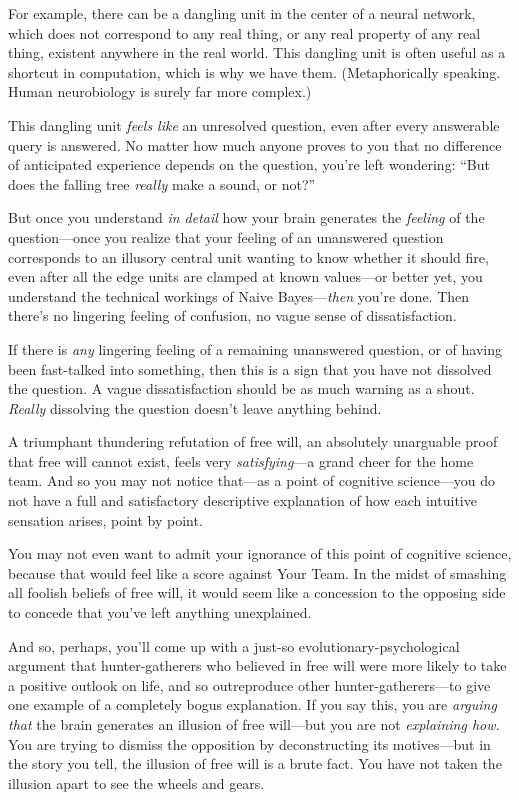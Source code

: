 {
 For example, there can be a dangling unit in the center of a
neural network, which does not correspond to any real thing, or any
real property of any real thing, existent anywhere in the real world.
This dangling unit is often useful as a shortcut in computation, which
is why we have them. (Metaphorically speaking. Human neurobiology is
surely far more complex.)}

{
 This dangling unit \textit{feels like} an unresolved question,
even after every answerable query is answered. No matter how much
anyone proves to you that no difference of anticipated experience
depends on the question, you're left wondering:
``But does the falling tree \textit{really} make a
sound, or not?''}

{
 But once you understand \textit{in detail} how your brain
generates the \textit{feeling} of the question---once you realize that
your feeling of an unanswered question corresponds to an illusory
central unit wanting to know whether it should fire, even after all the
edge units are clamped at known values---or better yet, you understand
the technical workings of Naive Bayes---\textit{then}
you're done. Then there's no lingering
feeling of confusion, no vague sense of dissatisfaction.}

{
 If there is \textit{any} lingering feeling of a remaining
unanswered question, or of having been fast-talked into something, then
this is a sign that you have not dissolved the question. A vague
dissatisfaction should be as much warning as a shout. \textit{Really}
dissolving the question doesn't leave anything behind.}

{
 A triumphant thundering refutation of free will, an absolutely
unarguable proof that free will cannot exist, feels very
\textit{satisfying}{}---a grand cheer for the home team. And so you may
not notice that---as a point of cognitive science---you do not have a
full and satisfactory descriptive explanation of how each intuitive
sensation arises, point by point.}

{
 You may not even want to admit your ignorance of this point of
cognitive science, because that would feel like a score against Your
Team. In the midst of smashing all foolish beliefs of free will, it
would seem like a concession to the opposing side to concede that
you've left anything unexplained.}

{
 And so, perhaps, you'll come up with a just-so
evolutionary-psychological argument that hunter-gatherers who believed
in free will were more likely to take a positive outlook on life, and
so outreproduce other hunter-gatherers---to give one example of a
completely bogus explanation. If you say this, you are \textit{arguing
that} the brain generates an illusion of free will---but you are not
\textit{explaining how.} You are trying to dismiss the opposition by
deconstructing its motives---but in the story you tell, the illusion of
free will is a brute fact. You have not taken the illusion apart to see
the wheels and gears.}

